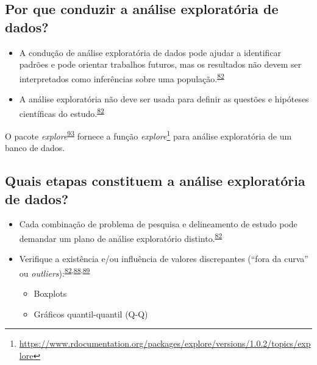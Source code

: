 \documentclass[
  a4paper,
]{book}
\renewcommand{\href}[2]{#2\footnote{\url{#1}}}
\newenvironment{infobox}[1]
  {
  \begin{itemize}
  \renewcommand{\labelitemi}{
    \raisebox{-.7\height}[0pt][0pt]{
      {\setkeys{Gin}{width=3em,keepaspectratio}
        \texttt{[image: \#1]}}
    }
  }
  \setlength{\fboxsep}{1em}
  \begin{blackbox}
  \item
  }
  {
  \end{blackbox}
  \end{itemize}
  }
\begin{document}
\hypertarget{por-que-conduzir-a-anuxe1lise-exploratuxf3ria-de-dados}{%
\subsection{Por que conduzir a análise exploratória de dados?}\label{por-que-conduzir-a-anuxe1lise-exploratuxf3ria-de-dados}}

\begin{itemize}
\item
  A condução de análise exploratória de dados pode ajudar a identificar padrões e pode orientar trabalhos futuros, mas os resultados não devem ser interpretados como inferências sobre uma população.\textsuperscript{\protect\hyperlink{ref-zuur2009}{82}}
\item
  A análise exploratória não deve ser usada para definir as questões e hipóteses científicas do estudo.\textsuperscript{\protect\hyperlink{ref-zuur2009}{82}}
\end{itemize}

\begin{infobox}{images/Rlogo}
O pacote \emph{explore}\textsuperscript{\protect\hyperlink{ref-explore}{93}} fornece a função \href{https://www.rdocumentation.org/packages/explore/versions/1.0.2/topics/explore}{\emph{explore}} para análise exploratória de um banco de dados.

\end{infobox}

\hypertarget{quais-etapas-constituem-a-anuxe1lise-exploratuxf3ria-de-dados}{%
\subsection{Quais etapas constituem a análise exploratória de dados?}\label{quais-etapas-constituem-a-anuxe1lise-exploratuxf3ria-de-dados}}

\begin{itemize}
\item
  Cada combinação de problema de pesquisa e delineamento de estudo pode demandar um plano de análise exploratório distinto.\textsuperscript{\protect\hyperlink{ref-zuur2009}{82}}
\item
  Verifique a existência e/ou influência de valores discrepantes (``fora da curva'' ou \emph{outliers}):\textsuperscript{\protect\hyperlink{ref-zuur2009}{82},\protect\hyperlink{ref-chatfield1986}{88},\protect\hyperlink{ref-Ferketich1986}{89}}

  \begin{itemize}
  \item
    Boxplots
  \item
    Gráficos quantil-quantil (Q-Q)
  \end{itemize}
\end{itemize}
\end{document}
